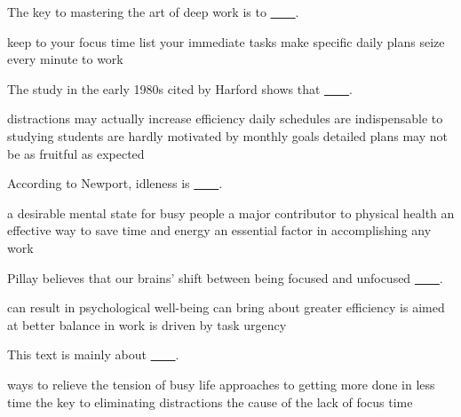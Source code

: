 \item The key to mastering the art of deep work is to \uline{~~~~}.
\begin{tasks}
	\task keep to your focus time
	\task list your immediate tasks
	\task make specific daily plans
	\task seize every minute to work
\end{tasks}
\item The study in the early 1980s cited by Harford shows that \uline{~~~~}.
\begin{tasks}
	\task distractions may actually increase efficiency
	\task daily schedules are indispensable to studying
	\task students are hardly motivated by monthly goals
	\task detailed plans may not be as fruitful as expected
\end{tasks}
\item According to Newport, idleness is \uline{~~~~}.
\begin{tasks}
	\task a desirable mental state for busy people
	\task a major contributor to physical health
	\task an effective way to save time and energy
	\task an essential factor in accomplishing any work
\end{tasks}
\item Pillay believes that our brains' shift between being focused and unfocused \uline{~~~~}.
\begin{tasks}
	\task can result in psychological well-being
	\task can bring about greater efficiency
	\task is aimed at better balance in work
	\task is driven by task urgency
\end{tasks}
\item This text is mainly about \uline{~~~~}.
\begin{tasks}
	\task ways to relieve the tension of busy life
	\task approaches to getting more done in less time
	\task the key to eliminating distractions
	\task the cause of the lack of focus time
\end{tasks}